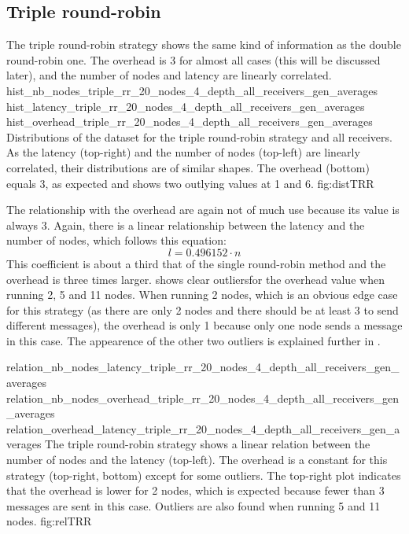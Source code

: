 \FloatBarrier
\subsection{Triple round-robin}
\label{ssec:tripleRR}
The triple round-robin strategy shows  the same kind of information as the
double round-robin one. The overhead is 3 for almost all cases (this will be
discussed later), and the number of nodes and latency are linearly correlated.
\triplefigure
    {hist_nb_nodes_triple_rr_20_nodes_4_depth_all_receivers_gen_averages}
    {hist_latency_triple_rr_20_nodes_4_depth_all_receivers_gen_averages}
    {hist_overhead_triple_rr_20_nodes_4_depth_all_receivers_gen_averages}
    {Distributions of the dataset for the triple round-robin strategy and all
    receivers. As the latency (top-right) and the number of nodes (top-left) are
    linearly correlated, their distributions are of similar shapes. The
    overhead (bottom) equals 3, as expected and shows two outlying values at 1
    and 6.}
    {fig:distTRR}

The relationship with the overhead are again not of much use because its value
is always 3. Again, there is a linear relationship between the latency and the
number of nodes, which follows this equation:
    \[l = 0.496152 \cdot n\]
This coefficient is about a third that of the single round-robin method and the
overhead is three times larger.
 shows clear outliersfor the overhead value when running
2, 5 and 11 nodes. When running 2 nodes, which is an obvious edge case for this
strategy (as there are only 2 nodes and there should be at least 3 to send
different messages), the overhead is only 1 because only one node sends a
message in this case. The appearence of the other two outliers is explained further in
. 

\triplefigure
    {relation_nb_nodes_latency_triple_rr_20_nodes_4_depth_all_receivers_gen_averages}
    {relation_nb_nodes_overhead_triple_rr_20_nodes_4_depth_all_receivers_gen_averages}
    {relation_overhead_latency_triple_rr_20_nodes_4_depth_all_receivers_gen_averages}
    {The triple round-robin strategy shows a linear relation between the number of
    nodes and the latency (top-left). The overhead is a constant for this
    strategy (top-right, bottom) except for some outliers. The top-right plot
    indicates that the overhead is lower for 2 nodes, which is expected because
    fewer than 3 messages are sent in this case. Outliers are also found when
    running 5 and 11 nodes.}
    {fig:relTRR}

